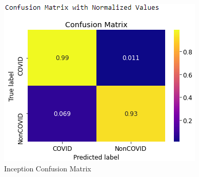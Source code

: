 \documentclass[a4paper,12pt]{report}
\begin{document}
  \begin{figure}[h] %
   \begin{center}
   \includegraphics[scale=0.6]{inception_chest_cm.png}
   \caption{Inception Confusion Matrix}
  \end{center}
  \end{figure}
  
  \pagebreak
  
\end{document}
